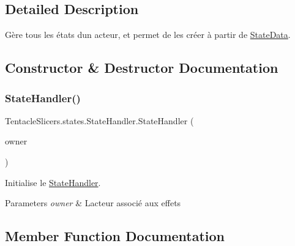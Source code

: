 \subsection{Detailed Description}
Gère tous les états d\textquotesingle{}un acteur, et permet de les créer à partir de \hyperlink{class_tentacle_slicers_1_1states_1_1_state_data}{State\+Data}. 



\subsection{Constructor \& Destructor Documentation}
\mbox{\label{class_tentacle_slicers_1_1states_1_1_state_handler_aea31ac8accd027f05f500328afdfa23a}} 
\subsubsection{\texorpdfstring{State\+Handler()}{StateHandler()}}
{\footnotesize\ttfamily Tentacle\+Slicers.\+states.\+State\+Handler.\+State\+Handler (\begin{DoxyParamCaption}\item[{\hyperlink{class_tentacle_slicers_1_1actors_1_1_controlled_actor}{Controlled\+Actor}}]{owner }\end{DoxyParamCaption})}



Initialise le \hyperlink{class_tentacle_slicers_1_1states_1_1_state_handler}{State\+Handler}. 


\begin{DoxyParams}{Parameters}
{\em owner} & L\textquotesingle{}acteur associé aux effets \\
\hline
\end{DoxyParams}


\subsection{Member Function Documentation}
\mbox{\label{class_tentacle_slicers_1_1states_1_1_state_handler_afe7417b5fa0bfa28f30a48b6daacabd9}} 
